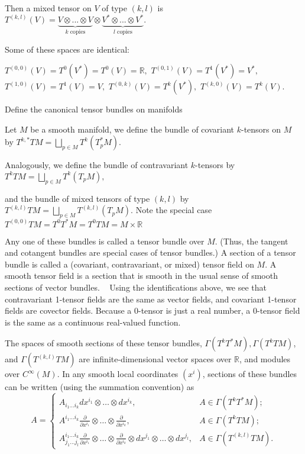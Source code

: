 Then a mixed tensor on \( V \) of type \( (k,l) \) is
\( T^{(k,l)}(V) = \underbrace{V \otimes ... \otimes V}_{k \text{ copies}} \otimes \underbrace{V^* \otimes ... \otimes V^*}_{l \text{ copies}}. \)

Some of these spaces are identical:

\( T^{(0,0)}(V) = T^0(V^*) = T^0(V) = \mathbb{R}, \)
\( T^{(0,1)}(V) = T^1(V^*) = V^*, \)
\( T^{(1,0)}(V) = T^1(V) = V, \)
\( T^{(0,k)}(V) = T^k(V^*), \)
\( T^{(k,0)}(V) = T^k(V). \)

Define the canonical tensor bundles on manifolds

Let \(M\) be a smooth manifold, we define the bundle of covariant \(k\)-tensors on \(M\) by
\(T^{k,*}TM = \bigsqcup_{p \in M} T^k (T_p^*M).\)

Analogously, we define the bundle of contravariant \(k\)-tensors by
\(T^{k}TM = \bigsqcup_{p \in M} T^k (T_pM),\)

and the bundle of mixed tensors of type \((k,l)\) by
\(T^{(k,l)}TM = \bigsqcup_{p \in M} T^{(k,l)} (T_pM).\)
Note the special case
\( T^{(0,0)} TM = T^{0}T^\ast M = T^{0}TM = M \times \mathbb{R} \)

Any one of these bundles is called a tensor bundle over \(M\). 
(Thus, the tangent and cotangent bundles are special cases of tensor bundles.) 
A section of a tensor bundle is called a (covariant, contravariant, or mixed) tensor field on \(M\). 
A smooth tensor field is a section that is smooth in the usual sense of smooth sections of vector bundles.   
Using the identifications above, we see that contravariant 1-tensor fields are the same as vector fields, and covariant 1-tensor fields are covector fields. 
Because a 0-tensor is just a real number, a 0-tensor field is the same as a continuous real-valued function. 

The spaces of smooth sections of these tensor bundles, \(\Gamma(T^{k}T^{*}M), \Gamma(T^{k}TM)\), 
and \(\Gamma(T^{(k,l)}TM)\) are infinite-dimensional vector spaces over \(\mathbb{R}\), and modules over \(C^{\infty}(M)\). 
In any smooth local coordinates \((x^{i})\), sections of these bundles can be written (using the summation convention) as
\[
A =
\begin{cases}
A_{i_1 \dots i_k} dx^{i_1} \otimes \dots \otimes dx^{i_k}, & A \in \Gamma(T^{k}T^*M); \\
A^{i_1 \dots i_k} \frac{\partial}{\partial x^{i_1}} \otimes \dots \otimes \frac{\partial}{\partial x^{i_k}}, & A \in \Gamma(T^{k}TM); \\
A^{i_1 \dots i_k}_{j_1 \dots j_l} \frac{\partial}{\partial x^{i_1}} \otimes \dots \otimes \frac{\partial}{\partial x^{i_k}} \otimes dx^{j_1} \otimes \dots \otimes dx^{j_l}, & A \in \Gamma(T^{(k,l)} TM).
\end{cases}
\]

